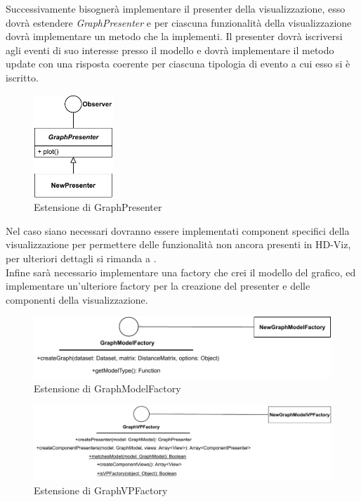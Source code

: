 \documentclass[../manuale_sviluppatore.tex]{subfiles}
\begin{document}
Successivamente bisognerà implementare il presenter della visualizzazione, esso dovrà estendere 
\emph{GraphPresenter} e per ciascuna funzionalità della visualizzazione dovrà implementare un metodo 
che la implementi. Il presenter dovrà iscriversi agli eventi di suo interesse presso il modello e 
dovrà implementare il metodo update con una risposta coerente per ciascuna tipologia di evento a cui 
esso si è iscritto.\\

\begin{figure}[H]
	\centering
	\includegraphics[width=3cm]{src/img/extendPresenter.pdf}
	\caption{Estensione di GraphPresenter}
\end{figure}


Nel caso siano necessari dovranno essere implementati component specifici della visualizzazione per 
permettere delle funzionalità non ancora presenti in HD-Viz, per ulteriori dettagli si rimanda a 
.\\

Infine sarà necessario implementare una factory che crei il modello del grafico, ed implementare 
un'ulteriore factory per la creazione del presenter e delle componenti della visualizzazione.

\begin{figure}[H]
	\centering
	\includegraphics[width=12cm]{src/img/extendModelFactory.pdf}
	\caption{Estensione di GraphModelFactory}
\end{figure}

\begin{figure}[H]
	\centering
	\includegraphics[width=15cm]{src/img/extendVPFactory.pdf}
	\caption{Estensione di GraphVPFactory}
\end{figure}
\end{document}

